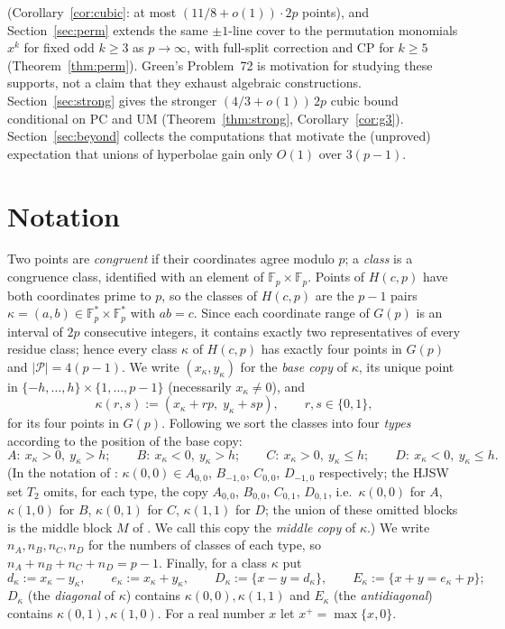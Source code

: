\documentclass[11pt]{article}
\theoremstyle{remark}
\newcommand{\Fp}{\mathbb{F}_p}
\newcommand{\Hc}{H(c,p)}
\newcommand{\Gp}{G(p)}
\newcommand{\Pset}{\mathcal{P}}
\begin{document}
(Corollary~\ref{cor:cubic}: at most $(11/8+o(1))\cdot2p$ points), and Section~\ref{sec:perm} extends the same $\pm1$-line cover to the
permutation monomials $x^k$ for fixed odd $k\ge3$ as $p\to\infty$, with full-split correction and CP for $k\ge5$
(Theorem~\ref{thm:perm}).  Green's Problem~72 \cite{Green} is motivation for studying these supports, not a claim that they exhaust algebraic constructions.
Section~\ref{sec:strong} gives the stronger $(4/3+o(1))\,2p$ cubic bound conditional on PC and UM
(Theorem~\ref{thm:strong}, Corollary~\ref{cor:g3}).  Section~\ref{sec:beyond} collects the computations that motivate the (unproved)
expectation that unions of hyperbolae gain only $O(1)$ over $3(p-1)$.

\section{Notation}

Two points are \emph{congruent} if their coordinates agree modulo $p$; a \emph{class} is a congruence class,
identified with an element of $\Fp\times\Fp$.  Points of $\Hc$ have both coordinates prime to $p$, so the classes of
$\Hc$ are the $p-1$ pairs $\kappa=(a,b)\in\Fp^*\times\Fp^*$ with $ab=c$.  Since each coordinate range of $\Gp$ is an
interval of $2p$ consecutive integers, it contains exactly two representatives of every residue class; hence
every class $\kappa$ of $\Hc$ has exactly four points in $\Gp$ and $|\Pset|=4(p-1)$.  We write
$(x_\kappa,y_\kappa)$ for the \emph{base copy} of $\kappa$, its unique point in
$\{-h,\dots,h\}\times\{1,\dots,p-1\}$ (necessarily $x_\kappa\ne0$), and
\[
 \kappa(r,s):=(x_\kappa+rp,\;y_\kappa+sp),\qquad r,s\in\{0,1\},
\]
for its four points in $\Gp$.  Following \cite{HJSW75,KNS25} we sort the classes into four \emph{types} according
to the position of the base copy:
\[
 A:\ x_\kappa>0,\ y_\kappa>h;\qquad B:\ x_\kappa<0,\ y_\kappa>h;\qquad C:\ x_\kappa>0,\ y_\kappa\le h;\qquad
 D:\ x_\kappa<0,\ y_\kappa\le h .
\]
(In the notation of \cite[Def.~2.3]{KNS25}: $\kappa(0,0)\in A_{0,0}$, $B_{-1,0}$, $C_{0,0}$, $D_{-1,0}$ respectively; the
HJSW set $T_2$ omits, for each type, the copy $A_{0,0}$, $B_{0,0}$, $C_{0,1}$, $D_{0,1}$, i.e.\ $\kappa(0,0)$ for
$A$, $\kappa(1,0)$ for $B$, $\kappa(0,1)$ for $C$, $\kappa(1,1)$ for $D$; the union of these omitted blocks is the middle
block $M$ of \cite[\S2.3]{KNS25}.  We call this copy the \emph{middle copy} of $\kappa$.)  We write $n_A,n_B,n_C,n_D$
for the numbers of classes of each type, so $n_A+n_B+n_C+n_D=p-1$.  Finally, for a class $\kappa$ put
\[
 d_\kappa:=x_\kappa-y_\kappa,\qquad e_\kappa:=x_\kappa+y_\kappa,\qquad
 D_\kappa:=\{x-y=d_\kappa\},\qquad E_\kappa:=\{x+y=e_\kappa+p\};
\]
$D_\kappa$ (the \emph{diagonal} of $\kappa$) contains $\kappa(0,0),\kappa(1,1)$ and $E_\kappa$ (the \emph{antidiagonal})
contains $\kappa(0,1),\kappa(1,0)$.  For a real number $x$ let $x^+=\max\{x,0\}$.
\end{document}
